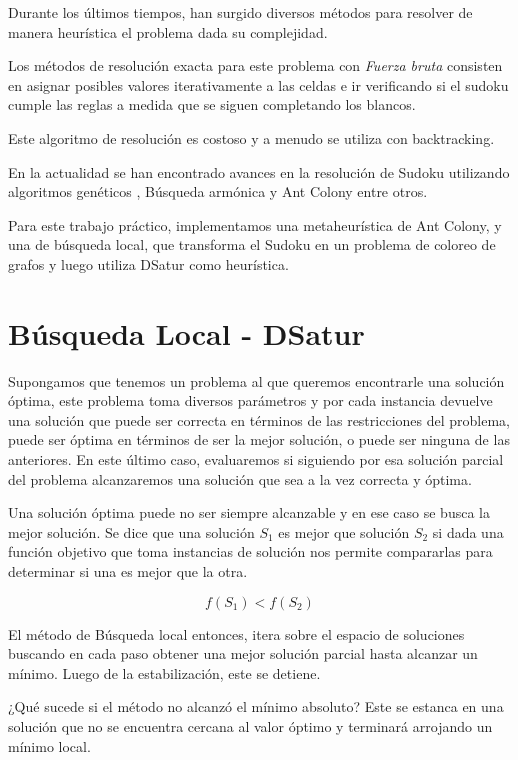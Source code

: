 \documentclass[a4paper,spanish]{article}
\begin{document}
Durante los últimos tiempos, han surgido diversos métodos para resolver
de manera heurística el problema dada su complejidad.

Los métodos de resolución exacta para este problema con \emph{Fuerza bruta}
consisten en asignar posibles valores iterativamente a las celdas e ir
verificando si el sudoku cumple las reglas a medida que se siguen completando
los blancos.

Este algoritmo de resolución es costoso y a menudo se utiliza con backtracking.


En la actualidad se han encontrado avances en la resolución de Sudoku utilizando
algoritmos genéticos \cite{mantere}, Búsqueda armónica
\cite{harmony} y Ant Colony \cite{ant_colony} entre otros.

Para este trabajo práctico, implementamos una metaheurística de Ant Colony, y una
de búsqueda local, que transforma el Sudoku en un problema de coloreo de grafos y
luego utiliza DSatur\cite{dsatur} como heurística.


\section{Búsqueda Local - DSatur}

Supongamos que tenemos un problema al que queremos encontrarle una solución
óptima, este problema toma diversos parámetros y por cada instancia
devuelve una solución que puede ser correcta en términos de las restricciones
del problema, puede ser óptima en términos de ser la mejor solución, o puede ser
ninguna de las anteriores. En este último caso, evaluaremos si siguiendo por esa
solución parcial del problema alcanzaremos una solución que sea a la vez
correcta y óptima.

Una solución óptima puede no ser siempre alcanzable y en ese caso se busca la
mejor solución. Se dice que una solución $S_1$ es mejor que solución $S_2$ si
dada una función objetivo  que toma instancias de solución nos permite
compararlas para determinar si una es mejor que la otra.

\begin{equation}
    f(S_1) < f(S_2) 
\end{equation}


El método de Búsqueda local entonces, itera sobre el espacio de soluciones
buscando en cada paso obtener una mejor solución parcial hasta alcanzar un
mínimo. Luego de la estabilización, este se detiene.

¿Qué sucede si el método no alcanzó el mínimo absoluto? Este se estanca
en una solución que no se encuentra cercana al valor óptimo y terminará
arrojando un mínimo local.
\end{document}
